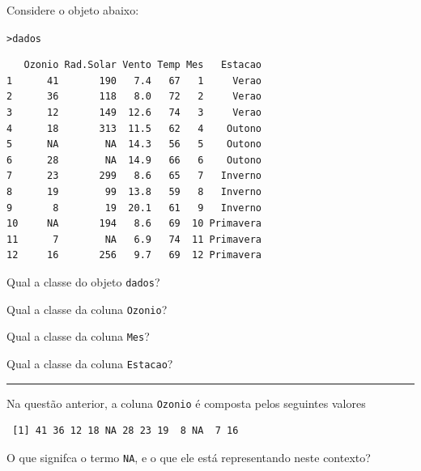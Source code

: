 \documentclass[a4paper,11pt,fleqn]{article}\usepackage[]{graphicx}\usepackage[]{color}
\makeatletter
\newcommand{\hlstd}[1]{\textcolor[rgb]{0,0,0}{#1}}%
\newenvironment{kframe}{%
 \def\at@end@of@kframe{}%
 \ifinner\ifhmode%
  \def\at@end@of@kframe{\end{minipage}}%
  \begin{minipage}{\columnwidth}%
 \fi\fi%
 \def\FrameCommand##1{\hskip\@totalleftmargin \hskip-\fboxsep
 \colorbox{shadecolor}{##1}\hskip-\fboxsep
     \hskip-\linewidth \hskip-\@totalleftmargin \hskip\columnwidth}%
 \MakeFramed {\advance\hsize-\width
   \@totalleftmargin\z@ \linewidth\hsize
   \@setminipage}}%
 {\par\unskip\endMakeFramed%
 \at@end@of@kframe}
\newenvironment{knitrout}{}{} %
\theoremstyle{definition}
\makeatother
\begin{document}
\begin{compactenum}[11.]
\item Considere o objeto abaixo:

\begin{knitrout}\small
{}\color{fgcolor}\begin{kframe}
\begin{alltt}
\hlstd{> }\hlstd{dados}
\end{alltt}
\begin{verbatim}
   Ozonio Rad.Solar Vento Temp Mes   Estacao
1      41       190   7.4   67   1     Verao
2      36       118   8.0   72   2     Verao
3      12       149  12.6   74   3     Verao
4      18       313  11.5   62   4    Outono
5      NA        NA  14.3   56   5    Outono
6      28        NA  14.9   66   6    Outono
7      23       299   8.6   65   7   Inverno
8      19        99  13.8   59   8   Inverno
9       8        19  20.1   61   9   Inverno
10     NA       194   8.6   69  10 Primavera
11      7        NA   6.9   74  11 Primavera
12     16       256   9.7   69  12 Primavera
\end{verbatim}
\end{kframe}
\end{knitrout}
\begin{compactenum}
  \item Qual a classe do objeto \texttt{dados}? \newline
  \item Qual a classe da coluna \texttt{Ozonio}? \newline
  \item Qual a classe da coluna \texttt{Mes}? \newline
  \item Qual a classe da coluna \texttt{Estacao}? \newline
\end{compactenum}
\end{compactenum}

\vspace{0.3cm}
\hrule
\vspace{0.3cm}

\begin{compactenum}[12.]
\item Na questão anterior, a coluna \texttt{Ozonio} é composta pelos
  seguintes valores
\begin{knitrout}\small
{}\color{fgcolor}\begin{kframe}
\begin{verbatim}
 [1] 41 36 12 18 NA 28 23 19  8 NA  7 16
\end{verbatim}
\end{kframe}
\end{knitrout}
O que signifca o termo \texttt{NA}, e o que ele está representando neste
contexto? \newline \newline \newline
\end{compactenum}
\end{document}
